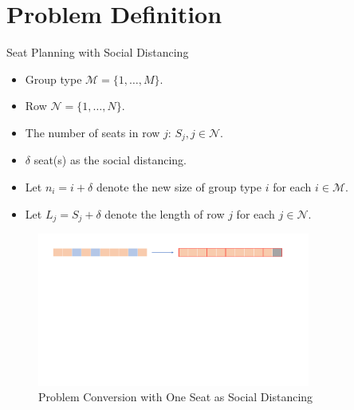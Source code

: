 
\section{Problem Definition}
    \frame{\sectionpage}

    \begin{frame}{Seat Planning with Social Distancing}
      \begin{itemize}
      \item Group type $\mathcal{M} = \{1, \ldots, M\}$.
      \item Row $\mathcal{N} = \{1, \ldots, N\}$.
      \item The number of seats in row $j$: $S_j, j \in \mathcal{N}$.
      \item $\delta$ seat(s) as the social distancing.
      \item Let $n_i = i + \delta$ denote the new size of group type $i$ for each $i \in \mathcal{M}$.
      \item Let $L_j = S_j + \delta$ denote the length of row $j$ for each $j \in \mathcal{N}$.
      \end{itemize}
      
      \begin{figure}[ht]
        \centering
        \includegraphics[width = 0.8\textwidth]{./images/dummy_seat.pdf}
        \caption{Problem Conversion with One Seat as Social Distancing}
    \end{figure}
    \end{frame}

